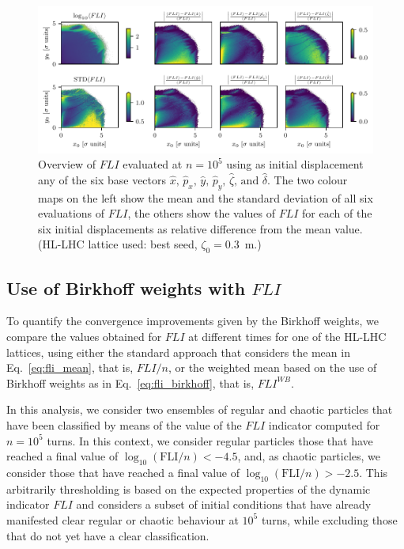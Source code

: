 \begin{figure}[htp]
    \centering
    \includegraphics[width=1.0\textwidth]{6_lhc_dynamic_indicators/figs/LE_FLI_high_main_idx_8.pdf}
    \caption{Overview of $FLI$ evaluated at $n=10^5$ using as initial displacement any of the six base vectors $\hat{x},\,\hat{p}_x,\,\hat{y},\,\hat{p}_y,\,\hat{\zeta},\,\text{and }\hat{\delta}$. The two colour maps on the left show the mean and the standard deviation of all six evaluations of $FLI$, the others show the values of $FLI$ for each of the six initial displacements as relative difference from the mean value. (HL-LHC lattice used: best seed, $\zeta_0=$\SI{0.3}{\meter}.)}
    \label{fig:fli_compare}
\end{figure}

\subsection{Use of Birkhoff weights with $FLI$}

To quantify the convergence improvements given by the Birkhoff weights, we compare the values obtained for $FLI$ at different times for one of the HL-LHC lattices, using either the standard approach that considers the mean in Eq.~\eqref{eq:fli_mean}, that is, $FLI/n$, or the weighted mean based on the use of Birkhoff weights as in Eq.~\eqref{eq:fli_birkhoff}, that is, $FLI^{WB}$.

In this analysis, we consider two ensembles of regular and chaotic particles that have been classified by means of the value of the $FLI$ indicator computed for $n=10^5$ turns. In this context, we consider regular particles those that have reached a final value of $\log_{10}(\mathrm{FLI}/n) < -4.5$, and, as chaotic particles, we consider those that have reached a final value of $\log_{10}(\mathrm{FLI}/n) > -2.5$. This arbitrarily thresholding is based on the expected properties of the dynamic indicator $FLI$ and considers a subset of initial conditions that have already manifested clear regular or chaotic behaviour at $10^5$ turns, while excluding those that do not yet have a clear classification.

